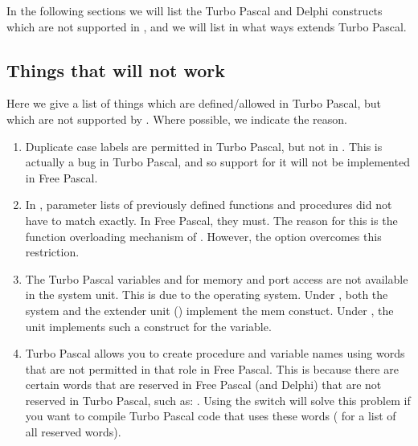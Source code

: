 In the following sections we will list the Turbo Pascal and Delphi 
constructs which are not supported in \fpc, and we will list in what
ways \fpc extends Turbo Pascal.

\subsection{Things that will not work}

Here we give a list of things which are defined/allowed in Turbo Pascal, but
which are not supported by \fpc. Where possible, we indicate the reason.
\begin{enumerate}
\item Duplicate case labels are permitted in Turbo Pascal, but not
in \fpc. This is actually a bug in Turbo Pascal, and so
support for it will not be implemented in Free Pascal.
\item In \tp, parameter lists of previously defined functions and 
procedures did not have to match exactly. In Free Pascal, they must. 
The reason for this is the function overloading mechanism of
\fpc. However, the  option overcomes this restriction.
\item The Turbo Pascal variables  and  for memory and port
access are not available in the system unit. This is due to the operating system. Under
\dos, both the system and the extender unit () implement the mem constuct. 
Under \linux, the  unit implements such a construct for the
 variable.
\item Turbo Pascal allows you to create procedure and variable names
using words that are not permitted in that role in Free Pascal.
This is because there are certain words that are reserved in
Free Pascal (and Delphi) that are not reserved in Turbo Pascal, such as:
.
Using the  switch will solve this problem if
you want to compile Turbo Pascal code that uses these words
( for a list of all reserved words).


\end{enumerate}
